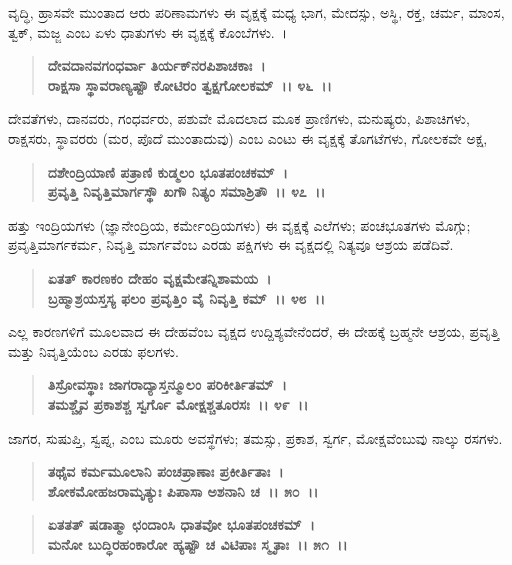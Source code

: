 ವೃದ್ಧಿ, ಹ್ರಾಸವೇ ಮುಂತಾದ ಆರು ಪರಿಣಾಮಗಳು ಈ ವೃಕ್ಷಕ್ಕೆ ಮಧ್ಯ ಭಾಗ, ಮೇದಸ್ಸು, ಅಸ್ಥಿ, ರಕ್ತ, ಚರ್ಮ, ಮಾಂಸ, ತ್ವಕ್, ಮಜ್ಜ ಎಂಬ ಏಳು ಧಾತುಗಳು ಈ ವೃಕ್ಷಕ್ಕೆ ಕೊಂಬೆಗಳು.~।

\begin{verse}
\textbf{ದೇವದಾನವಗಂಧರ್ವಾ ತಿರ್ಯಕ್‌ನರಪಿಶಾಚಕಾಃ~।}\\\textbf{ರಾಕ್ಷಸಾ ಸ್ಥಾವರಾಣ್ಯಷ್ಟೌ ಕೋಟಿರಂ ತ್ವಕ್ಷಗೋಲಕಮ್~।। ೪೬~।।}
\end{verse}

ದೇವತೆಗಳು, ದಾನವರು, ಗಂಧರ್ವರು, ಪಶುವೇ ಮೊದಲಾದ ಮೂಕ ಪ್ರಾಣಿಗಳು, ಮನುಷ್ಯರು, ಪಿಶಾಚಿಗಳು, ರಾಕ್ಷಸರು, ಸ್ಥಾವರರು (ಮರ, ಪೊದೆ ಮುಂತಾದುವು) ಎಂಬ ಎಂಟು ಈ ವೃಕ್ಷಕ್ಕೆ ತೊಗಟೆಗಳು, ಗೋಲಕವೇ ಅಕ್ಷ,

\begin{verse}
\textbf{ದಶೇಂದ್ರಿಯಾಣಿ ಪತ್ರಾಣಿ ಕುಡ್ಮಲಂ ಭೂತಪಂಚಕಮ್~।}\\\textbf{ಪ್ರವೃತ್ತಿ ನಿವೃತ್ತಿಮಾರ್ಗಸ್ಥೌ ಖಗೌ ನಿತ್ಯಂ ಸಮಾಶ್ರಿತೌ~।। ೪೭~।।}
\end{verse}

ಹತ್ತು ಇಂದ್ರಿಯಗಳು (ಜ್ಞಾನೇಂದ್ರಿಯ, ಕರ್ಮೇಂದ್ರಿಯಗಳು) ಈ ವೃಕ್ಷಕ್ಕೆ ಎಲೆಗಳು; ಪಂಚಭೂತಗಳು ಮೊಗ್ಗು; ಪ್ರವೃತ್ತಿಮಾರ್ಗಕರ್ಮ, ನಿವೃತ್ತಿ ಮಾರ್ಗವೆಂಬ ಎರಡು ಪಕ್ಷಿಗಳು ಈ ವೃಕ್ಷದಲ್ಲಿ ನಿತ್ಯವೂ ಆಶ್ರಯ ಪಡೆದಿವೆ.

\begin{verse}
\textbf{ಏತತ್ ಕಾರಣಕಂ ದೇಹಂ ವೃಕ್ಷಮೇತನ್ನಿಶಾಮಯ~।}\\\textbf{ಬ್ರಹ್ಮಾಶ್ರಯಸ್ತಸ್ಯ ಫಲಂ ಪ್ರವೃತ್ತಿಂ ವೈ ನಿವೃತ್ತಿ ಕಮ್~।। ೪೮~।।}
\end{verse}

ಎಲ್ಲ ಕಾರಣಗಳಿಗೆ ಮೂಲವಾದ ಈ ದೇಹವೆಂಬ ವೃಕ್ಷದ ಉದ್ದಿಶ್ಯವೇನೆಂದರೆ, ಈ ದೇಹಕ್ಕೆ ಬ್ರಹ್ಮನೇ ಆಶ್ರಯ, ಪ್ರವೃತ್ತಿ ಮತ್ತು ನಿವೃತ್ತಿಯೆಂಬ ಎರಡು ಫಲಗಳು.

\begin{verse}
\textbf{ತಿಸ್ರೋವಸ್ಥಾಃ ಜಾಗರಾದ್ಯಾಸ್ತನ್ಮೂಲಂ ಪರಿಕೀರ್ತಿತಮ್~।}\\\textbf{ತಮಶ್ಚೈವ ಪ್ರಕಾಶಶ್ಚ ಸ್ವರ್ಗೊ ಮೋಕ್ಷಶ್ಚತೂರಸಃ~।। ೪೯~।।}
\end{verse}

ಜಾಗರ, ಸುಷುಪ್ತಿ, ಸ್ವಪ್ನ, ಎಂಬ ಮೂರು ಅವಸ್ಥೆಗಳು; ತಮಸ್ಸು, ಪ್ರಕಾಶ, ಸ್ವರ್ಗ, ಮೋಕ್ಷವೆಂಬುವು ನಾಲ್ಕು ರಸಗಳು.

\begin{verse}
\textbf{ತಥೈವ ಕರ್ಮಮೂಲಾನಿ ಪಂಚಪ್ರಾಣಾಃ ಪ್ರಕೀರ್ತಿತಾಃ~।}\\\textbf{ಶೋಕಮೋಹಜರಾಮೃತ್ಯುಃ ಪಿಪಾಸಾ ಅಶನಾನಿ ಚ~।। ೫೦~।।}
\end{verse}

\begin{verse}
\textbf{ಏತತತ್ ಷಡಾತ್ಮಾ ಛಂದಾಂಸಿ ಧಾತವೋ ಭೂತಪಂಚಕಮ್~।}\\\textbf{ಮನೋ ಬುದ್ಧಿರಹಂಕಾರೋ ಹ್ಯಷ್ಟೌ ಚ ವಿಟಿಪಾಃ ಸ್ಮೃತಾಃ~।। ೫೧~।।}
\end{verse}

